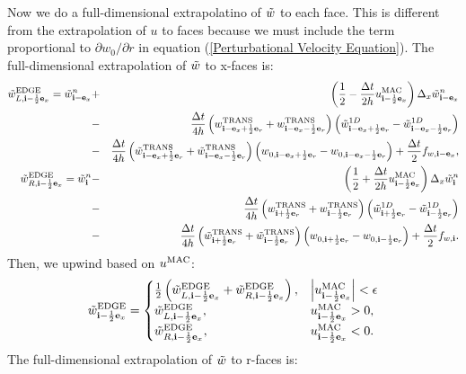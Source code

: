 Now we do a full-dimensional extrapolatino of $\tilde{w}$ to each face.
This is different from the extrapolation of $u$ to faces because we
must include the term proportional to $\partial w_0/\partial r$ in
equation (\ref{Perturbational Velocity Equation}).  The
full-dimensional extrapolation of $\tilde{w}$ to x-faces is:
\begin{eqnarray}
\tilde{w}_{L,{\bf i}-\frac{1}{2}{\bf e}_x}^{\rm EDGE} = \tilde{w}_{{\bf i}-{\bf e}_x}^n &+& \left(\frac{1}{2} - \frac{\Delta t}{2h}u_{{\bf i}-\frac{1}{2}{\bf e}_x}^{\rm MAC}\right)\Delta_x \tilde{w}_{{\bf i}-{\bf e}_x}^n \nonumber \\
&-& \frac{\Delta t}{4h}\left(w_{{\bf i}-{\bf e}_x+\frac{1}{2}{\bf e}_r}^{\rm TRANS}+w_{{\bf i}-{\bf e}_x-\frac{1}{2}{\bf e}_r}^{\rm TRANS}\right)\left(\tilde{w}_{{\bf i}-{\bf e}_x+\frac{1}{2}{\bf e}_r}^{1D} - \tilde{w}_{{\bf i}-{\bf e}_x-\frac{1}{2}{\bf e}_r}^{1D}\right) \nonumber \\
&-& \frac{\Delta t}{4h}\left(\tilde{w}_{{\bf i}-{\bf e}_x+\frac{1}{2}{\bf e}_r}^{\rm TRANS}+\tilde{w}_{{\bf i}-{\bf e}_x-\frac{1}{2}{\bf e}_r}^{\rm TRANS}\right)\left(w_{0,{\bf i}-{\bf e}_x+\frac{1}{2}{\bf e}_r}-w_{0,{\bf i}-{\bf e}_x-\frac{1}{2}{\bf e}_r}\right) + \frac{\Delta t}{2}f_{w,{\bf i}-{\bf e}_x}, \label{wt_L x-edge} \\
\tilde{w}_{R,{\bf i}-\frac{1}{2}{\bf e}_x}^{\rm EDGE} = \tilde{w}_{{\bf i}}^n &-& \left(\frac{1}{2} + \frac{\Delta t}{2h}u_{{\bf i}-\frac{1}{2}{\bf e}_x}^{\rm MAC}\right)\Delta_x \tilde{w}_{{\bf i}}^n \nonumber \\
&-& \frac{\Delta t}{4h}\left(w_{{\bf i}+\frac{1}{2}{\bf e}_r}^{\rm TRANS}+w_{{\bf i}-\frac{1}{2}{\bf e}_r}^{\rm TRANS}\right)\left(\tilde{w}_{{\bf i}+\frac{1}{2}{\bf e}_r}^{1D} - \tilde{w}_{{\bf i}-\frac{1}{2}{\bf e}_r}^{1D}\right) \nonumber \\
&-& \frac{\Delta t}{4h}\left(\tilde{w}_{{\bf i}+\frac{1}{2}{\bf e}_r}^{\rm TRANS}+\tilde{w}_{{\bf i}-\frac{1}{2}{\bf e}_r}^{\rm TRANS}\right)\left(w_{0,{\bf i}+\frac{1}{2}{\bf e}_r}-w_{0,{\bf i}-\frac{1}{2}{\bf e}_r}\right) + \frac{\Delta t}{2}f_{w,{\bf i}}. \label{wt_R x-edge}
\end{eqnarray}
Then, we upwind based on $u^{\rm MAC}$:
\begin{equation}
\tilde{w}_{{\bf i}-\frac{1}{2}{\bf e}_x}^{\rm EDGE} =
\begin{cases}
\frac{1}{2}\left(\tilde{w}_{L,{\bf i}-\frac{1}{2}{\bf e}_x}^{\rm EDGE} + \tilde{w}_{R,{\bf i}-\frac{1}{2}{\bf e}_x}^{\rm EDGE}\right), & \left|u^{\rm MAC}_{{\bf i}-\frac{1}{2}{\bf e}_x}\right| < \epsilon \\
\tilde{w}_{L,{\bf i}-\frac{1}{2}{\bf e}_x}^{\rm EDGE}, & u^{\rm MAC}_{{\bf i}-\frac{1}{2}{\bf e}_x} > 0, \\
\tilde{w}_{R,{\bf i}-\frac{1}{2}{\bf e}_x}^{\rm EDGE}, & u^{\rm MAC}_{{\bf i}-\frac{1}{2}{\bf e}_x} < 0.
\end{cases}
\end{equation}
The full-dimensional extrapolation of $\tilde{w}$ to r-faces is:
